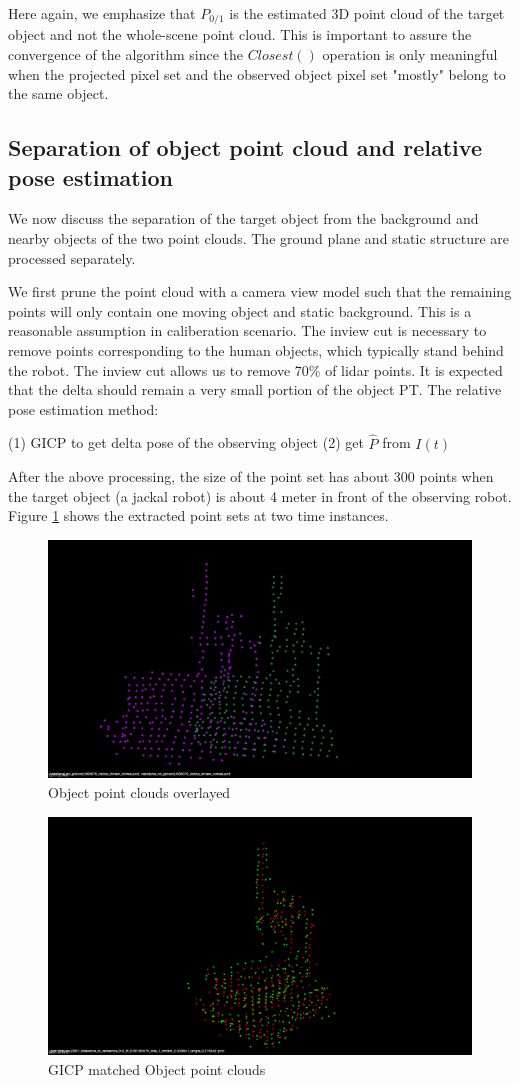 \documentclass[journal]{IEEEtran}
\begin{document}
Here again, we emphasize that $P_{0/1}$ is the estimated 3D point cloud 
of the target object and not the whole-scene point cloud. This is important to assure the convergence of the algorithm since the $Closest()$ operation is only meaningful when the projected pixel set and the observed object pixel set "mostly" belong to the same object. 

\subsection{Separation of object point cloud and relative pose estimation}
We now discuss the separation of the target object from the background and nearby objects of the two point clouds. The ground plane and static structure are processed separately. 

We first prune the point cloud with a camera view model such that the remaining points will only contain one moving object and static background. This is a reasonable assumption in caliberation scenario. The inview cut is necessary to remove points corresponding to the human objects, which typically stand behind the robot. The inview cut allows us to remove 70\% of lidar points.
It is expected that the delta should remain a very small portion of the object PT. 
The relative pose estimation method:

(1) GICP to get delta pose of the observing object
(2) get $\hat{P}$ from $I(t)$

After the above processing, the size of the point set has about 300 points when the target object (a jackal robot) is about 4 meter in front of the observing robot. Figure \ref{fig:objext} shows the extracted point sets at two time instances.

\begin{figure}[]
    \centering
    \includegraphics[width=0.5\columnwidth]{images/obj_072_075.png}
    \caption{Object point clouds overlayed}
    \label{fig:objext}
\end{figure} 
\begin{figure}[]
    \centering
    \includegraphics[width=0.5\columnwidth]{images/gicp_072_075.png}
    \caption{GICP matched Object point clouds}
    \label{fig:gicp_result}
\end{figure} 
\end{document}
